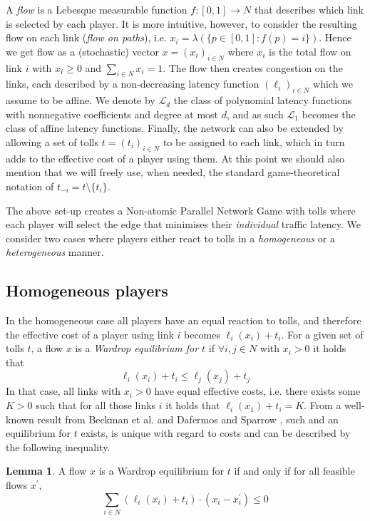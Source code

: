 \documentclass[10pt,a4paper]{book}
\theoremstyle{definition}
\newtheorem{lemma}[definition]{Lemma}
\theoremstyle{comment}
\begin{document}
A \textit{flow} is a Lebesque measurable function $f: [0, 1] \rightarrow N$ that describes which link is selected by each player.
It is more intuitive, however, to consider the resulting flow on each link (\textit{flow on paths}), i.e. $x_i = \lambda(\{p \in [0, 1]: f(p) = i\})$.
Hence we get flow as a (stochastic) vector $x = (x_i)_{i \in N}$ where $x_i$ is the total flow on link $i$ with $x_i \geq 0$ and $\sum_{i \in N}x_i = 1$.
The flow then creates congestion on the links, each described by a non-decreasing latency function $(\ell_i)_{i \in N}$ which we assume to be affine.
We denote by $\mathcal{L}_d$ the class of polynomial latency functions with nonnegative coefficients and degree at most $d$, and as such $\mathcal{L}_1$ becomes the class of affine latency functions.
Finally, the network can also be extended by allowing a set of tolls $t = (t_i)_{i \in N}$ to be assigned to each link, which in turn adds to the effective cost of a player using them.
At this point we should also mention that we will freely use, when needed, the standard game-theoretical notation of $t_{-i} = t \setminus \{t_i\}$.

The above set-up creates a Non-atomic Parallel Network Game with tolls where each player will select the edge that minimises their \textit{individual} traffic latency.
We consider two cases where players either react to tolls in a \textit{homogeneous} or a \textit{heterogeneous} manner.

\subsection*{Homogeneous players}

In the homogeneous case all players have an equal reaction to tolls, and therefore the effective cost of a player using link $i$ becomes $\ell_i(x_i) + t_i$.
For a given set of tolls $t$, a flow $x$ is a \textit{Wardrop equilibrium for $t$} if $\forall i, j \in N$ with $x_i > 0$ it holds that
\begin{equation*}
	\ell_i(x_i) + t_i \leq \ell_j(x_j) + t_j
\end{equation*}
In that case, all links with $x_i > 0$ have equal effective costs, i.e. there exists some $K > 0$ such that for all those links $i$ it holds that $\ell_i(x_1) + t_i = K$.
From a well-known result from Beckman et al. \cite{beckmann1956studies} and Dafermos and Sparrow \cite{1363388843888284416}, such and an equilibrium for $t$ exists, is unique with regard to costs and can be described by the following inequality.
\begin{lemma}
	\label{lemma:wardrop_equilibrium}
	A flow $x$ is a Wardrop equilibrium for $t$ if and only if for all feasible flows $x^\prime$,
	\[\sum_{i \in N} (\ell_i(x_i) + t_i) \cdot (x_i - x_i^\prime) \leq 0\]
\end{lemma}
\end{document}
